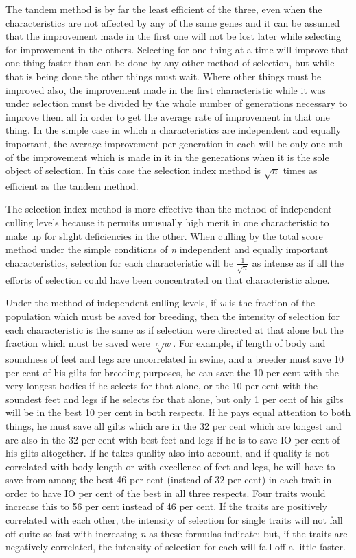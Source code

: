 The tandem method is by far the least efficient of the three, even
when the characteristics are not affected by any of the same genes and it
can be assumed that the improvement made in the first one will not
be lost later while selecting for improvement in the others. Selecting for
one thing at a time will improve that one thing faster than can be done
by any other method of selection, but while that is being done the other
things must wait. Where other things must be improved also, the
improvement made in the first characteristic while it was under selection
must be divided by the whole number of generations necessary to
improve them all in order to get the average rate of improvement in
that one thing. In the simple case in which n characteristics are independent
and equally important, the average improvement per generation
in each will be only one nth of the improvement which is made in
it in the generations when it is the sole object of selection. In this case
the selection index method is $\sqrt{n}$ times as efficient as the tandem
method.

The selection index method is more effective than the method of
independent culling levels because it permits unusually high merit in
one characteristic to make up for slight deficiencies in the other. When
culling by the total score method under the simple conditions of \textit{n} independent
and equally important characteristics, selection for each characteristic
will be $\frac{1}{\sqrt{n}}$ as intense as if all the efforts of selection could
have been concentrated on that characteristic alone.

Under the method of independent culling levels, if \textit{w} is the fraction
of the population which must be saved for breeding, then the intensity
of selection for each characteristic is the same as if selection were directed
at that alone but the fraction which must be saved were $\sqrt[n]{w}$. For
example, if length of body and soundness of feet and legs are uncorrelated
in swine, and a breeder must save 10 per cent of his gilts for breeding
purposes, he can save the 10 per cent with the very longest bodies if
he selects for that alone, or the 10 per cent with the soundest feet and
legs if he selects for that alone, but only 1 per cent of his gilts will be in
the best 10 per cent in both respects. If he pays equal attention to both
things, he must save all gilts which are in the 32 per cent which are
longest and are also in the 32 per cent with best feet and legs if he is to
save IO per cent of his gilts altogether. If he takes quality also into
account, and if quality is not correlated with body length or with
excellence of feet and legs, he will have to save from among the best 46 per
cent (instead of 32 per cent) in each trait in order to have IO per cent of
the best in all three respects. Four traits would increase this to 56 per
cent instead of 46 per cent. If the traits are positively correlated with
each other, the intensity of selection for single traits will not fall off
quite so fast with increasing \textit{n} as these formulas indicate; but, if the
traits are negatively correlated, the intensity of selection for each will
fall off a little faster.

